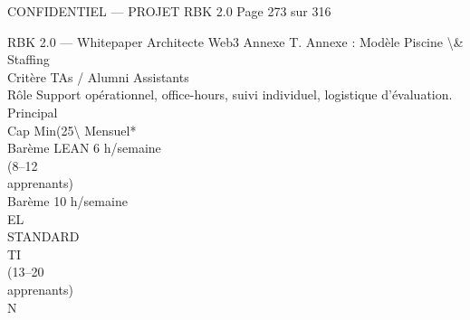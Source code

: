 \vspace{0.5em}
\vspace{0.5em}
\vspace{0.5em}
\begin{confidential}CONFIDENTIEL — PROJET RBK 2.0                 Page 273 sur 316\end{confidential}
RBK 2.0 — Whitepaper Architecte Web3                                                                    Annexe T. Annexe : Modèle Piscine \textbackslash{}& Staffing\\
\vspace{0.5em}
\vspace{0.5em}
\vspace{0.5em}
\vspace{0.5em}
Critère          TAs / Alumni Assistants\\
\vspace{0.5em}
Rôle             Support opérationnel, office-hours, suivi individuel, logistique d’évaluation.\\
Principal\\
\vspace{0.5em}
Cap              Min(25\textbackslash{}%
Mensuel*\\
\vspace{0.5em}
Barème LEAN 6 h/semaine\\
(8–12\\
apprenants)\\
\vspace{0.5em}
Barème           10 h/semaine\\
\vspace{0.5em}
\vspace{0.5em}
\vspace{0.5em}
\vspace{0.5em}
EL\\
STANDARD\\
\vspace{0.5em}
\vspace{0.5em}
\vspace{0.5em}
\vspace{0.5em}
TI\\
(13–20\\
apprenants)\\
\vspace{0.5em}
\vspace{0.5em}
\vspace{0.5em}
\vspace{0.5em}
N\\

